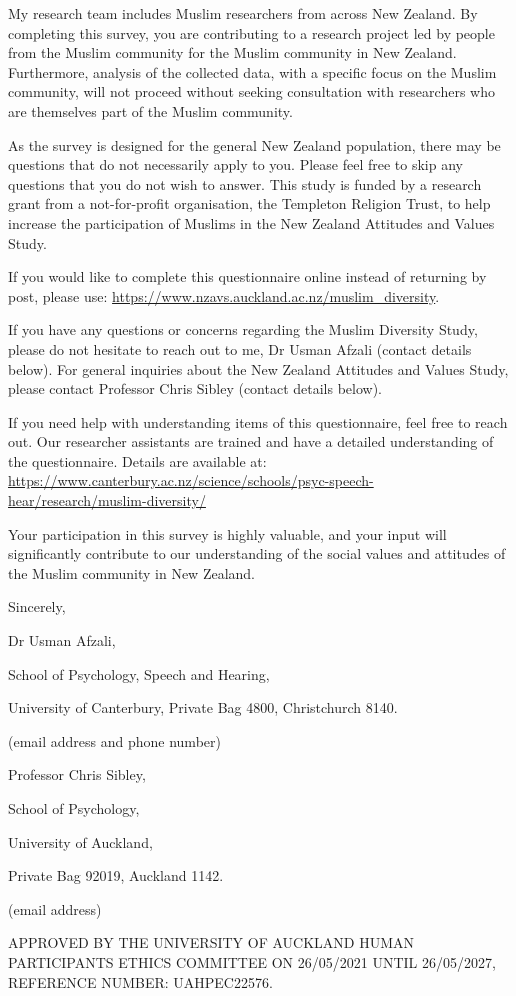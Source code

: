 \documentclass[
]{interact}
\begin{document}
\noindent My research team includes Muslim researchers from across New
Zealand. By completing this survey, you are contributing to a research
project led by people from the Muslim community for the Muslim community
in New Zealand. Furthermore, analysis of the collected data, with a
specific focus on the Muslim community, will not proceed without seeking
consultation with researchers who are themselves part of the Muslim
community.

\noindent As the survey is designed for the general New Zealand
population, there may be questions that do not necessarily apply to you.
Please feel free to skip any questions that you do not wish to answer.
This study is funded by a research grant from a not-for-profit
organisation, the Templeton Religion Trust, to help increase the
participation of Muslims in the New Zealand Attitudes and Values Study.

\begin{tcolorbox}[enhanced jigsaw, arc=.35mm, left=2mm, colback=white, opacityback=0, breakable, leftrule=.75mm, rightrule=.15mm, bottomrule=.15mm, toprule=.15mm, colframe=quarto-callout-color-frame]

If you would like to complete this questionnaire online instead of
returning by post, please use:
\url{https://www.nzavs.auckland.ac.nz/muslim_diversity}.

\end{tcolorbox}

\noindent If you have any questions or concerns regarding the Muslim
Diversity Study, please do not hesitate to reach out to me, Dr Usman
Afzali (contact details below). For general inquiries about the New
Zealand Attitudes and Values Study, please contact Professor Chris
Sibley (contact details below).

\noindent If you need help with understanding items of this
questionnaire, feel free to reach out. Our researcher assistants are
trained and have a detailed understanding of the questionnaire. Details
are available at:
\url{https://www.canterbury.ac.nz/science/schools/psyc-speech-hear/research/muslim-diversity/}

\noindent Your participation in this survey is highly valuable, and your
input will significantly contribute to our understanding of the social
values and attitudes of the Muslim community in New Zealand.

\noindent Sincerely,

Dr Usman Afzali,

School of Psychology, Speech and Hearing,

University of Canterbury, Private Bag 4800, Christchurch 8140.

(email address and phone number)

Professor Chris Sibley,

School of Psychology,

University of Auckland,

Private Bag 92019, Auckland 1142.

(email address)

\noindent APPROVED BY THE UNIVERSITY OF AUCKLAND HUMAN PARTICIPANTS
ETHICS COMMITTEE ON 26/05/2021 UNTIL 26/05/2027, REFERENCE NUMBER:
UAHPEC22576.
\end{document}
